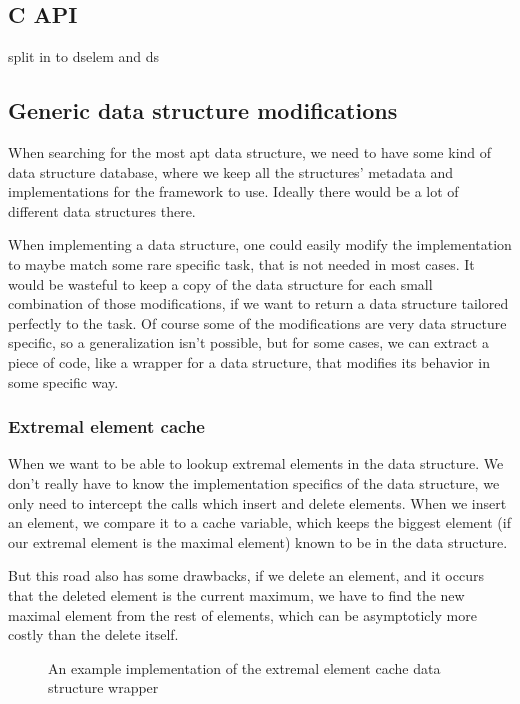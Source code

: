 \documentclass[a4paper,11pt]{article}
\begin{document}
	\subsection{C API}
		split in to dselem and ds


	\subsection{Generic data structure modifications} \label{sub:gdsm}

		When searching for the most apt data structure, we need to have some kind of data structure database,
		where we keep all the structures' metadata and implementations for the framework to use. Ideally there
		would be a lot of different data structures there.

		When implementing a data structure, one could easily modify the implementation to maybe match some rare
		specific task, that is not needed in most cases. It would be wasteful to keep a copy of the data
		structure for each small combination of those modifications, if we want to return a data structure
		tailored perfectly to the task. Of course some of the modifications are very data structure specific, so
		a generalization isn't possible, but for some cases, we can extract a piece of code, like a wrapper for
		a data structure, that modifies its behavior in some specific way.

		\subsubsection{Extremal element cache}

			When we want to be able to lookup extremal elements in the data structure. We don't really have
			to know the implementation specifics of the data structure, we only need to intercept the calls
			which insert and delete elements. When we insert an element, we compare it to a cache variable,
			which keeps the biggest element (if our extremal element is the maximal element) known to be in
			the data structure.

			But this road also has some drawbacks, if we delete an element, and it occurs that the deleted
			element is the current maximum, we have to find the new maximal element from the rest of
			elements, which can be asymptoticly more costly than the delete itself.


			\begin{figure}
				

				\caption{An example implementation of the extremal element cache data structure wrapper}

				\label{fig:elem-cache}
			\end{figure}
\end{document}

